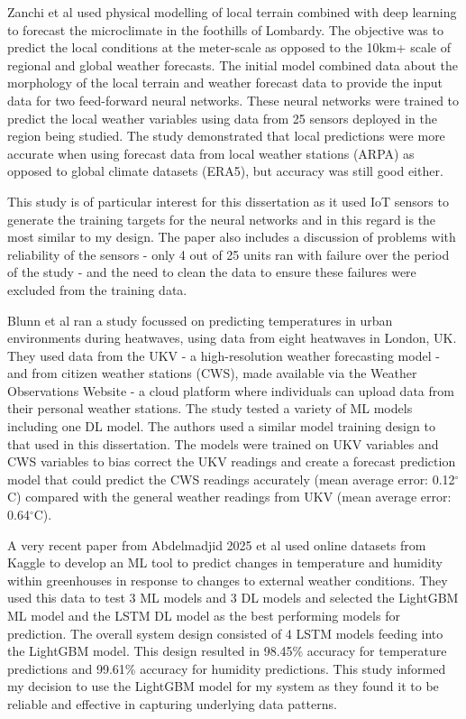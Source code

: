 Zanchi et al \cite{zanchi2023harnessing} used physical modelling of local
terrain combined with deep learning to forecast the microclimate in the
foothills of Lombardy. The objective was to predict the local conditions at the
meter-scale as opposed to the 10km+ scale of regional and global weather
forecasts. The initial model combined data about the morphology of the local
terrain and weather forecast data to provide the input data for two feed-forward
neural networks. These neural networks were trained to predict the local weather
variables using data from 25 sensors deployed in the region being studied.  The
study demonstrated that local predictions were more accurate when using forecast
data from local weather stations (ARPA) as opposed to global climate datasets
(ERA5), but accuracy was still good either.

This study is of particular interest for this dissertation as it used IoT
sensors to generate the training targets for the neural networks and in this
regard is the most similar to my design. The paper also includes a discussion of
problems with reliability of the sensors - only 4 out of 25 units ran with
failure over the period of the study - and the need to clean the data to ensure
these failures were excluded from the training data.

Blunn et al \cite{blunn2024machine} ran a study focussed on predicting
temperatures in urban environments during heatwaves, using data from eight
heatwaves in London, UK. They used data from the UKV - a high-resolution weather
forecasting model - and from citizen weather stations (CWS), made available via
the Weather Observations Website - a cloud platform where individuals can upload
data from their personal weather stations. The study tested a variety of ML
models including one DL model. The authors used a similar model training design
to that used in this dissertation. The models were trained on UKV variables and
CWS variables to bias correct the UKV readings and create a forecast prediction
model that could predict the CWS readings accurately (mean average error:
0.12\(^\circ\)C) compared with the general weather readings from UKV (mean
average error: 0.64\(^\circ\)C).

A very recent paper from Abdelmadjid 2025 et al used online datasets from Kaggle
to develop an ML tool to predict changes in temperature and humidity within
greenhouses in response to changes to external weather conditions.  They used
this data to test 3 ML models and 3 DL models and selected the LightGBM ML model
and the LSTM DL model as the best performing models for prediction. The overall
system design consisted of 4 LSTM models feeding into the LightGBM model. This
design resulted in 98.45\% accuracy for temperature predictions and 99.61\%
accuracy for humidity predictions. This study informed my decision to use the
LightGBM model for my system as they found it  to be reliable and effective in
capturing underlying data patterns.